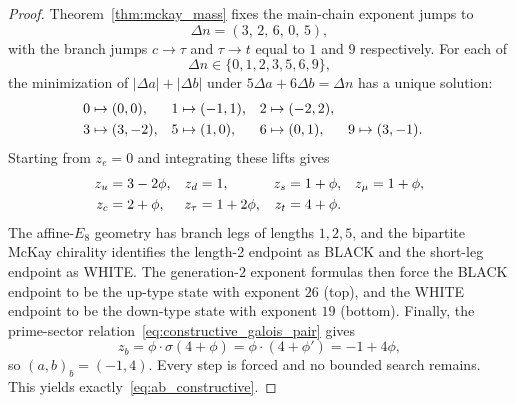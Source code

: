\documentclass[12pt,a4paper]{article}
\theoremstyle{definition}
\begin{document}
\begin{proof}
Theorem~\ref{thm:mckay_mass} fixes the main-chain exponent jumps to
\begin{equation}
\Delta n = (3,\,2,\,6,\,0,\,5),
\end{equation}
with the branch jumps $c \to \tau$ and $\tau \to t$ equal to $1$ and $9$ respectively.  For each of
\begin{equation}
\Delta n \in \{0,1,2,3,5,6,9\},
\end{equation}
the minimization of $|\Delta a|+|\Delta b|$ under $5\Delta a + 6\Delta b = \Delta n$ has a unique solution:
\begin{align}
0 &\mapsto (0,0), &
1 &\mapsto (-1,1), &
2 &\mapsto (-2,2), \notag\\
3 &\mapsto (3,-2), &
5 &\mapsto (1,0), &
6 &\mapsto (0,1), &
9 &\mapsto (3,-1). \label{eq:minimal_lifts}
\end{align}
Starting from $z_e = 0$ and integrating these lifts gives
\begin{align}
z_u &= 3 - 2\phi, &
z_d &= 1, &
z_s &= 1 + \phi, &
z_\mu &= 1 + \phi, \notag\\
z_c &= 2 + \phi, &
z_\tau &= 1 + 2\phi, &
z_t &= 4 + \phi. \label{eq:constructive_chain}
\end{align}
The affine-$E_8$ geometry has branch legs of lengths $1,2,5$, and the bipartite McKay chirality identifies the length-2 endpoint as BLACK and the short-leg endpoint as WHITE.  The generation-$2$ exponent formulas then force the BLACK endpoint to be the up-type state with exponent $26$ (top), and the WHITE endpoint to be the down-type state with exponent $19$ (bottom).  Finally, the prime-sector relation~\eqref{eq:constructive_galois_pair} gives
\begin{equation}
z_b = \phi \cdot \sigma(4+\phi) = \phi \cdot (4+\phi') = -1 + 4\phi,
\end{equation}
so $(a,b)_b = (-1,4)$.  Every step is forced and no bounded search remains.  This yields exactly~\eqref{eq:ab_constructive}.
\end{proof}
\end{document}
